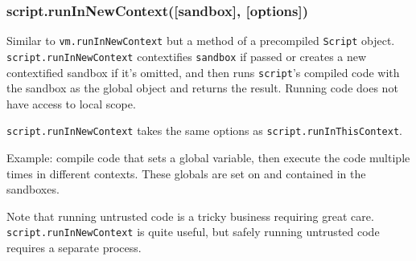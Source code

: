 \subsubsection{script.runInNewContext({[}sandbox{]},
{[}options{]})}\label{script.runinnewcontextsandbox-options}

Similar to \texttt{vm.runInNewContext} but a method of a precompiled
\texttt{Script} object. \texttt{script.runInNewContext} contextifies
\texttt{sandbox} if passed or creates a new contextified sandbox if it's
omitted, and then runs \texttt{script}'s compiled code with the sandbox
as the global object and returns the result. Running code does not have
access to local scope.

\texttt{script.runInNewContext} takes the same options as
\texttt{script.runInThisContext}.

Example: compile code that sets a global variable, then execute the code
multiple times in different contexts. These globals are set on and
contained in the sandboxes.

\begin{Shaded}
\begin{Highlighting}[]
 \NormalTok{(}\NormalTok{);}
 \NormalTok{(}\NormalTok{);}

 

  \NormalTok{(}\NormalTok{);}

\NormalTok{(} 
\NormalTok{\});}

\NormalTok{(}

\end{Highlighting}
\end{Shaded}

Note that running untrusted code is a tricky business requiring great
care. \texttt{script.runInNewContext} is quite useful, but safely
running untrusted code requires a separate process.
